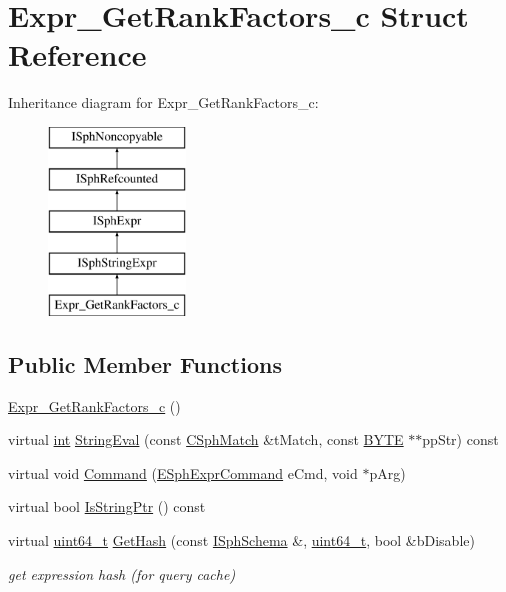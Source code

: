 \hypertarget{structExpr__GetRankFactors__c}{\section{Expr\-\_\-\-Get\-Rank\-Factors\-\_\-c Struct Reference}
\label{structExpr__GetRankFactors__c}
}
Inheritance diagram for Expr\-\_\-\-Get\-Rank\-Factors\-\_\-c\-:\begin{figure}[H]
\begin{center}
\leavevmode
\includegraphics[height=5.000000cm]{structExpr__GetRankFactors__c}
\end{center}
\end{figure}
\subsection*{Public Member Functions}
\begin{DoxyCompactItemize}
\item 
\hyperlink{structExpr__GetRankFactors__c_ad18004577707822b5d0caf04e07928f3}{Expr\-\_\-\-Get\-Rank\-Factors\-\_\-c} ()
\item 
virtual \hyperlink{sphinxexpr_8cpp_a4a26e8f9cb8b736e0c4cbf4d16de985e}{int} \hyperlink{structExpr__GetRankFactors__c_afbffed9ce7c4e8270df150d9bdf6bce5}{String\-Eval} (const \hyperlink{classCSphMatch}{C\-Sph\-Match} \&t\-Match, const \hyperlink{sphinxstd_8h_a4ae1dab0fb4b072a66584546209e7d58}{B\-Y\-T\-E} $\ast$$\ast$pp\-Str) const 
\item 
virtual void \hyperlink{structExpr__GetRankFactors__c_a9895dd549abfc75e9fb27b343cdba9ab}{Command} (\hyperlink{sphinxexpr_8h_a30be184fb07bd80c271360fc6094c818}{E\-Sph\-Expr\-Command} e\-Cmd, void $\ast$p\-Arg)
\item 
virtual bool \hyperlink{structExpr__GetRankFactors__c_a8c404aa8d3d823663e3a6c867e281e2d}{Is\-String\-Ptr} () const 
\item 
virtual \hyperlink{sphinxstd_8h_aaa5d1cd013383c889537491c3cfd9aad}{uint64\-\_\-t} \hyperlink{structExpr__GetRankFactors__c_a8b6b9a0058dce32c4e3ee5f07d80042f}{Get\-Hash} (const \hyperlink{classISphSchema}{I\-Sph\-Schema} \&, \hyperlink{sphinxstd_8h_aaa5d1cd013383c889537491c3cfd9aad}{uint64\-\_\-t}, bool \&b\-Disable)
\begin{DoxyCompactList}\small\item\em get expression hash (for query cache) \end{DoxyCompactList}\end{DoxyCompactItemize}
